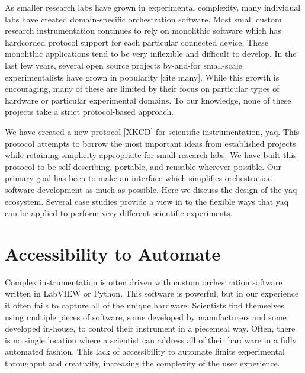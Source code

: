 \documentclass[aip, amsmath, amssymb, reprint,]{revtex4-1}
\begin{document}
As smaller research labs have grown in experimental complexity, many individual labs have created domain-specific orchestration software.
Most small custom research instrumentation continues to rely on monolithic software which has hardcorded protocol support for each particular connected device.
These monolithic applications tend to be very inflexible and difficult to develop.
In the last few years, several open source projects by-and-for small-scale experimentalists have grown in popularity [cite many].
While this growth is encouraging, many of these are limited by their focus on particular types of hardware or particular experimental domains.
To our knowledge, none of these projects take a strict protocol-based approach.

We have created a new protocol [XKCD] for scientific instrumentation, yaq.
This protocol attempts to borrow the most important ideas from established projects while retaining simplicity appropriate for small research labs.
We have built this protocol to be self-describing, portable, and reusable wherever possible.
Our primary goal has been to make an interface which simplifies orchestration software development as much as possible.
Here we discuss the design of the yaq ecosystem.
Several case studies provide a view in to the flexible ways that yaq can be applied to perform very different scientific experiments.

\section{Accessibility to Automate}

Complex instrumentation is often driven with custom orchestration software written in LabVIEW or Python.
This software is powerful, but in our experience it often fails to capture all of the unique hardware.
Scientists find themselves using multiple pieces of software, some developed by manufacturers and some developed in-house, to control their instrument in a piecemeal way.
Often, there is no single location where a scientist can address all of their hardware in a fully automated fashion.
This lack of accessibility to automate limits experimental throughput and creativity, increasing the complexity of the user experience.
\end{document}
